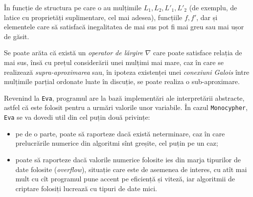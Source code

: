 În funcție de structura pe care o au mulțimile $ L_1, L_2, L'_1, L'_2 $ (de exemplu,
de latice cu proprietăți suplimentare, cel mai adesea), funcțiile $ f, f' $,
dar și elementele care să satisfacă inegalitatea de mai sus pot fi mai greu sau mai
ușor de găsit.

Se poate arăta că există un \emph{operator de lărgire} $ \nabla $ care poate satisface
relația de mai sus, însă cu prețul considerării unei mulțimi mai mare, caz în care
se realizează \emph{supra-aproximarea} sau, în ipoteza existenței unei
\emph{conexiuni Galois} între mulțimile parțial ordonate luate în discuție,
se poate realiza o sub-aproximare.

\vspace{1cm}

Revenind la \texttt{Eva}, programul are la bază implementări ale interpretării
abstracte, astfel că este folosit pentru a urmări valorile unor variabile.
În cazul \texttt{Monocypher}, \texttt{Eva} se va dovedi util din cel puțin două
privințe:
\begin{itemize}
\item pe de o parte, poate să raporteze dacă există neterminare, caz în care
  prelucrările numerice din algoritmi sînt greșite, cel puțin pe un caz;
\item poate să raporteze dacă valorile numerice folosite ies din marja tipurilor de
  date folosite (\emph{overflow}), situație care este de asemenea de interes, cu atît
  mai mult cu cît programul pune accent pe eficiență și viteză, iar algoritmii de
  criptare folosiți lucrează cu tipuri de date mici.
\end{itemize}




